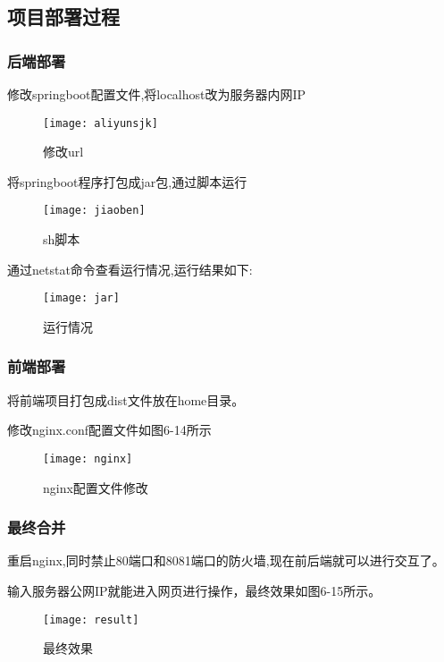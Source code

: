 \subsection{项目部署过程}
\subsubsection{后端部署}
修改springboot配置文件,将localhost改为服务器内网IP
\begin{figure}[htbp]
	\centering
	\texttt{[image: aliyunsjk]}
	\caption{修改url}
	\vspace{\baselineskip}
\end{figure}

将springboot程序打包成jar包,通过脚本运行
\begin{figure}[htbp]
	\centering
	\texttt{[image: jiaoben]}
	\caption{sh脚本}
	\vspace{\baselineskip}
\end{figure}
通过netstat命令查看运行情况,运行结果如下:

\begin{figure}[htbp]
	\centering
	\texttt{[image: jar]}
	\caption{运行情况}
	\vspace{\baselineskip}
\end{figure}

\subsubsection{前端部署}
将前端项目打包成dist文件放在home目录。

修改nginx.conf配置文件如图6-14所示
\begin{figure}[htbp]
	\centering
	\texttt{[image: nginx]}
	\caption{nginx配置文件修改}
	\vspace{\baselineskip}
\end{figure}

\subsubsection{最终合并}
重启nginx,同时禁止80端口和8081端口的防火墙,现在前后端就可以进行交互了。

输入服务器公网IP就能进入网页进行操作，最终效果如图6-15所示。
\begin{figure}[htbp]
	\centering
	\texttt{[image: result]}
	\caption{最终效果}
	\vspace{\baselineskip}
\end{figure}